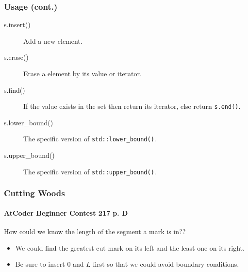\documentclass{beamer}
\begin{document}
\frame
{
	\frametitle{Usage (cont.)}
	
	\begin{description}
		\item[\ttfamily s.insert()] Add a new element.
		\item[\ttfamily s.erase()] Erase a element by its value or iterator.
		\item[\ttfamily s.find()] If the value exists in the set then return its iterator, else return \texttt{s.end()}.
		\item[\ttfamily s.lower\_bound()] The specific version of \texttt{std::lower\_bound()}.
		\item[\ttfamily s.upper\_bound()] The specific version of \texttt{std::upper\_bound()}.
	\end{description}
}

\frame
{
	\frametitle{Cutting Woods}
	\framesubtitle{AtCoder Beginner Contest 217 p. D}
	
	How could we know the length of the segment a mark is in??\pause
	
	\begin{itemize}
		\item We could find the greatest cut mark on its left and the least one on its right.\pause
		\item Be sure to insert $0$ and $L$ first so that we could avoid boundary  conditions.
	\end{itemize}
}
\end{document}
